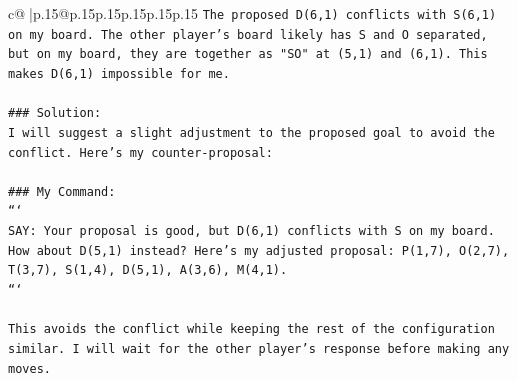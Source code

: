 \documentclass{article}
\begin{document}
{\begin{supertabular}{c@{$\;$}|p{.15\linewidth}@{}p{.15\linewidth}p{.15\linewidth}p{.15\linewidth}p{.15\linewidth}p{.15\linewidth}}
{{{\texttt{The proposed D(6,1) conflicts with S(6,1) on my board. The other player's board likely has S and O separated, but on my board, they are together as "SO" at (5,1) and (6,1). This makes D(6,1) impossible for me.} \\
\\ 
\texttt{\#\#\# Solution:} \\
\texttt{I will suggest a slight adjustment to the proposed goal to avoid the conflict. Here's my counter{-}proposal:} \\
\\ 
\texttt{\#\#\# My Command:} \\
\texttt{```} \\
\texttt{SAY: Your proposal is good, but D(6,1) conflicts with S on my board. How about D(5,1) instead? Here's my adjusted proposal: P(1,7), O(2,7), T(3,7), S(1,4), D(5,1), A(3,6), M(4,1).} \\
\texttt{```} \\
\\ 
\texttt{This avoids the conflict while keeping the rest of the configuration similar. I will wait for the other player's response before making any moves.} \\
            }
        }
    }
     \\ \\


\end{supertabular}}
\end{document}
